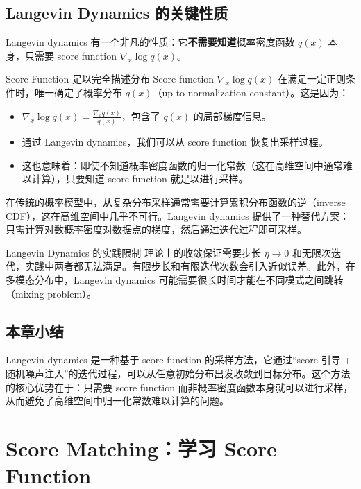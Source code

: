 \documentclass[a4paper]{article}
\begin{document}
\subsection{Langevin Dynamics 的关键性质}

Langevin dynamics 有一个非凡的性质：它\textbf{不需要知道}概率密度函数 $q(x)$ 本身，只需要 score function $\nabla_x \log q(x)$。

\begin{importantbox}{Score Function 足以完全描述分布}
Score function $\nabla_x \log q(x)$ 在满足一定正则条件时，唯一确定了概率分布 $q(x)$（up to normalization constant）。这是因为：
\begin{itemize}
    \item $\nabla_x \log q(x) = \frac{\nabla_x q(x)}{q(x)}$，包含了 $q(x)$ 的局部梯度信息。
    \item 通过 Langevin dynamics，我们可以从 score function 恢复出采样过程。
    \item 这也意味着：即使不知道概率密度函数的归一化常数（这在高维空间中通常难以计算），只要知道 score function 就足以进行采样。
\end{itemize}
\end{importantbox}

在传统的概率模型中，从复杂分布采样通常需要计算累积分布函数的逆（inverse CDF），这在高维空间中几乎不可行。Langevin dynamics 提供了一种替代方案：只需计算对数概率密度对数据点的梯度，然后通过迭代过程即可采样。

\begin{warningbox}{Langevin Dynamics 的实践限制}
理论上的收敛保证需要步长 $\eta \to 0$ 和无限次迭代，实践中两者都无法满足。有限步长和有限迭代次数会引入近似误差。此外，在多模态分布中，Langevin dynamics 可能需要很长时间才能在不同模式之间跳转（mixing problem）。
\end{warningbox}

\subsection{本章小结}

Langevin dynamics 是一种基于 score function 的采样方法，它通过``score 引导 + 随机噪声注入''的迭代过程，可以从任意初始分布出发收敛到目标分布。这个方法的核心优势在于：只需要 score function 而非概率密度函数本身就可以进行采样，从而避免了高维空间中归一化常数难以计算的问题。

\section{Score Matching：学习 Score Function}
\end{document}
